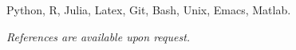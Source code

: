 \documentclass[
  date,
  number,
]{wgu-cv}
\begin{document}

Python,
R,
Julia,
Latex,
Git,
Bash,
Unix,
Emacs,
Matlab.



\emph{References are available upon request.}



\end{document}

